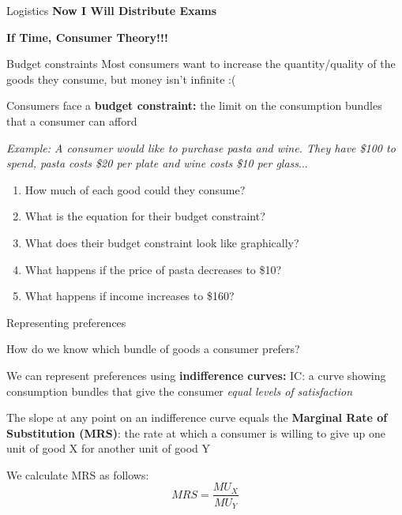 \documentclass[compress]{beamer}
\begin{document}
\begin{frame}{Logistics}
    \textbf{Now I Will Distribute Exams}

    \textbf{If Time, Consumer Theory!!!}

\end{frame}

\begin{frame}

\end{frame}

\begin{frame}{Budget constraints}
Most consumers want to increase the quantity/quality of the goods they consume, but money isn't infinite :(

\begin{block}{Consumers face a \textbf{budget constraint:}}
    the limit on the consumption bundles that a consumer can afford
\end{block}
    \vspace{3mm}
\textit{Example: A consumer would like to purchase pasta and wine. They have \$100 to spend, pasta costs \$20 per plate and wine costs \$10 per glass}...
\begin{enumerate}
    \item How much of each good could they consume?
    \item What is the equation for their budget constraint?
    \item What does their budget constraint look like graphically?
    \item What happens if the price of pasta decreases to \$10?
    \item What happens if income increases to \$160?
\end{enumerate}
\end{frame}

\begin{frame}{Representing preferences}
\begin{center}
    How do we know which bundle of goods a consumer prefers?
\end{center}
    \begin{block}{We can represent preferences using \textbf{indifference curves:}}
IC: a curve showing consumption bundles that give the consumer \textit{equal levels of satisfaction}

\vspace{3mm}

The slope at any point on an indifference curve equals the \textbf{Marginal Rate of Substitution (MRS)}: the rate at which a consumer is willing to give up one unit of good X for another unit of good Y
    \end{block}

    \vspace{2mm}

    We calculate MRS as follows:
    \[MRS = \frac{MU_X}{MU_Y}\]
\end{frame}
\end{document}
